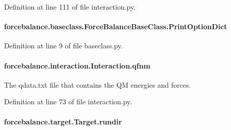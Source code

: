 Definition at line 111 of file interaction.\-py.

\hypertarget{classforcebalance_1_1baseclass_1_1ForceBalanceBaseClass_a5c55e661e746d1a4443f4e0bc34ebe05}{
\paragraph[{Print\-Option\-Dict}]{\setlength{\rightskip}{0pt plus 5cm}forcebalance.\-baseclass.\-Force\-Balance\-Base\-Class.\-Print\-Option\-Dict\hspace{0.3cm}{\ttfamily [inherited]}}}\label{classforcebalance_1_1baseclass_1_1ForceBalanceBaseClass_a5c55e661e746d1a4443f4e0bc34ebe05}


Definition at line 9 of file baseclass.\-py.

\hypertarget{classforcebalance_1_1interaction_1_1Interaction_a6b49404cbea9c353fc4b97506ff143c6}{
\paragraph[{qfnm}]{\setlength{\rightskip}{0pt plus 5cm}forcebalance.\-interaction.\-Interaction.\-qfnm\hspace{0.3cm}{\ttfamily [inherited]}}}\label{classforcebalance_1_1interaction_1_1Interaction_a6b49404cbea9c353fc4b97506ff143c6}


The qdata.\-txt file that contains the Q\-M energies and forces. 



Definition at line 73 of file interaction.\-py.

\hypertarget{classforcebalance_1_1target_1_1Target_a6872de5b2d4273b82336ea5b0da29c9e}{
\paragraph[{rundir}]{\setlength{\rightskip}{0pt plus 5cm}forcebalance.\-target.\-Target.\-rundir\hspace{0.3cm}{\ttfamily [inherited]}}}\label{classforcebalance_1_1target_1_1Target_a6872de5b2d4273b82336ea5b0da29c9e}


